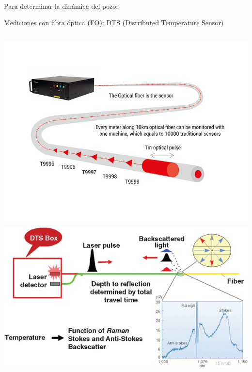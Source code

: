 \documentclass[presentation]{beamer}
\begin{document}
\begin{frame}{Para determinar la dinámica del pozo:}
	\begin{block}{Mediciones con fibra óptica (FO): DTS (Distributed Temperature Sensor)}
	\end{block} 
	\begin{columns}
		\includegraphics[scale=2, width=\textwidth]{./dts.png}
		\includegraphics[scale=2, width=\textwidth]{./dts2.png}
		

\end{columns}
\end{frame}
\end{document}
